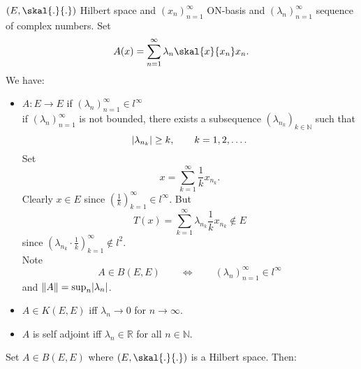 

$(E,\skal{.}{.})$ Hilbert space and $(x_n)_{n=1}^{\infty}$ ON-basis and $(\lambda_n)_{n=1}^{\infty}$ sequence of complex numbers.
Set 
\[
	A(x) = \sum_{n=1}^{\infty}\lambda_n \skal{x}{x_n}x_n.
\]
We have: 
\begin{itemize}
	\item $A: E \to E$ if $(\lambda_n)_{n=1}^{\infty} \in l^{\infty}$ \\
	if $(\lambda_n)_{n=1}^{\infty}$ is not bounded, there exists a subsequence $(\lambda_{n_k})_{k \in \mathbb{N}}$ such that
	\[
		\lvert\lambda_{n_k}\rvert \geq k, \qquad k=1,2,\dots.
	\] 
	Set 
	\[
		x = \sum_{k=1}^{\infty}\frac{1}{k}x_{n_k}.
	\]
	Clearly $x \in E$ since $\left( \frac{1}{k} \right)_{k=1}^{\infty} \in l^{\infty}$. But
	\[
		T(x) = \sum_{k=1}^{\infty} \lambda_{n_k} \frac{1}{k} x_{n_k} \not \in E
	\]
	since $\left( \lambda_{n_k} \cdot \frac{1}{k} \right)_{k=1}^{\infty} \not \in l^2$. \\
	Note
	\[
		A \in B(E,E) \qquad \Leftrightarrow \qquad (\lambda_n)_{n=1}^{\infty} \in l^{\infty}
	\]
	and $\norm{A} = \sup_{n} \abs{\lambda_n}$.
	\item $A \in K(E,E)$ iff $\lambda_n \to 0$ for $n \to \infty$.
	\item $A$ is self adjoint iff $\lambda_n \in \mathbb{R}$ for all $n \in \mathbb{N}$.
\end{itemize}
Set $A \in B(E,E)$ where $(E,\skal{.}{.})$ is a Hilbert space. Then:
